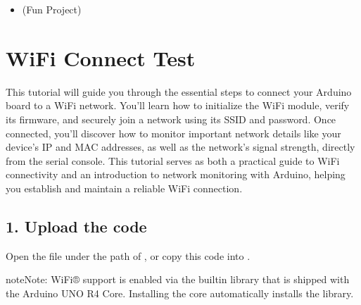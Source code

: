 \documentclass[a4paper,11pt,english]{sphinxmanual}
\begin{document}
\sphinxAtStartPar
{}
\begin{itemize}
\item {} 
\sphinxAtStartPar
{} (Fun Project)

\end{itemize}

\sphinxstepscope


\section{WiFi Connect Test}
\label{\detokenize{Extension_Project/WiFi_Connect_Test:wifi-connect-test}}\label{\detokenize{Extension_Project/WiFi_Connect_Test:ext-wifi-connect-test}}\label{\detokenize{Extension_Project/WiFi_Connect_Test::doc}}
\sphinxAtStartPar
This tutorial will guide you through the essential steps to connect your Arduino board to a Wi\sphinxhyphen{}Fi network. You’ll learn how to initialize the Wi\sphinxhyphen{}Fi module, verify its firmware, and securely join a network using its SSID and password. Once connected, you’ll discover how to monitor important network details like your device’s IP and MAC addresses, as well as the network’s signal strength, directly from the serial console. This tutorial serves as both a practical guide to Wi\sphinxhyphen{}Fi connectivity and an introduction to network monitoring with Arduino, helping you establish and maintain a reliable Wi\sphinxhyphen{}Fi connection.


\subsection{1. Upload the code}
\label{\detokenize{Extension_Project/WiFi_Connect_Test:upload-the-code}}
\sphinxAtStartPar
Open the  file under the path of , or copy this code into .

\begin{sphinxadmonition}{note}{Note:}
\sphinxAtStartPar
Wi\sphinxhyphen{}Fi® support is enabled via the built\sphinxhyphen{}in  library that is shipped with the Arduino UNO R4 Core. Installing the core automatically installs the  library.
\end{sphinxadmonition}
\end{document}
